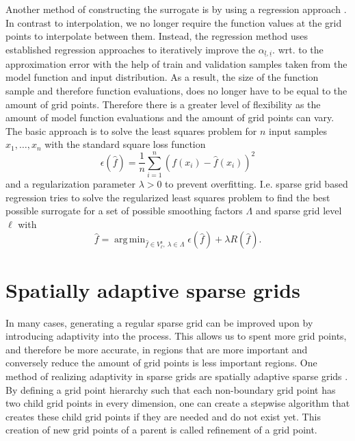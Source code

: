 \documentclass[
  a4paper,  %
  twoside,  %
  bibliography=totoc,
  headsepline,
  cleardoublepage=empty,
  parskip=half,
  draft=false
]{scrbook}
\DeclareMathOperator*{\argmin}{arg\,min}
\begin{document}
Another method of constructing the surrogate is by using a regression approach \cite{}.
In contrast to interpolation, we no longer require the function values at the grid points to interpolate between them.
Instead, the regression method uses established regression approaches to iteratively improve the $\alpha_{\underline{l},\underline{i}}$. wrt. to the approximation error with the help of train and validation samples taken from the model function and input distribution.
As a result, the size of the function sample and therefore function evaluations, does no longer have to be equal to the amount of grid points.
Therefore there is a greater level of flexibility as the amount of model function evaluations and the amount of grid points can vary.
The basic approach is to solve the least squares problem for $n$ input samples $x_1, \dots, x_n$ with the standard square loss function
\begin{equation}
\epsilon(\hat{f})=\frac{1}{n} \sum_{i=1}^n (f(x_i) - \hat{f}(x_i))^2 
\end{equation}
and a regularization parameter $\lambda > 0$ to prevent overfitting.
I.e. sparse grid based regression tries to solve the regularized least squares problem to find the best possible surrogate for a set of possible smoothing factors $\Lambda$ and sparse grid level $\ell$ with
\begin{equation}
\hat{f} = \argmin_{\hat{f} \in V^{\text{s}}_{\ell}, ~ \lambda \in \Lambda} \epsilon(\hat{f}) + \lambda R(\hat{f}).
\end{equation}

\section{Spatially adaptive sparse grids}

In many cases, generating a regular sparse grid can be improved upon by introducing adaptivity into the process.
This allows us to spent more grid points, and therefore be more accurate, in regions that are more important and conversely reduce the amount of grid points is less important regions.
One method of realizing adaptivity in sparse grids are spatially adaptive sparse grids \cite{}.
By defining a grid point hierarchy such that each non-boundary grid point has two child grid points in every dimension, one can create a stepwise algorithm that creates these child grid points if they are needed and do not exist yet.
This creation of new grid points of a parent is called refinement of a grid point.
\end{document}
